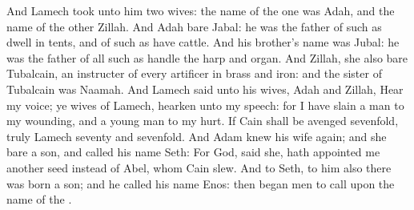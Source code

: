 \begin{biblechapter}
\verse And Lamech took unto him two wives: the name of the one was Adah, and the name of the other Zillah.
\verse And Adah bare Jabal: he was the father of such as dwell in tents, and of such as have cattle.
\verse And his brother's name was Jubal: he was the father of all such as handle the harp and organ.
\verse And Zillah, she also bare Tubalcain, an instructer of every artificer in brass and iron: and the sister of Tubalcain was Naamah.
\verse And Lamech said unto his wives, Adah and Zillah, Hear my voice; ye wives of Lamech, hearken unto my speech: for I have slain a man to my wounding, and a young man to my hurt.
\verse If Cain shall be avenged sevenfold, truly Lamech seventy and sevenfold.
\verse And Adam knew his wife again; and she bare a son, and called his name Seth: For God, said she, hath appointed me another seed instead of Abel, whom Cain slew.
\verse And to Seth, to him also there was born a son; and he called his name Enos: then began men to call upon the name of the \LORD.
\end{biblechapter}

